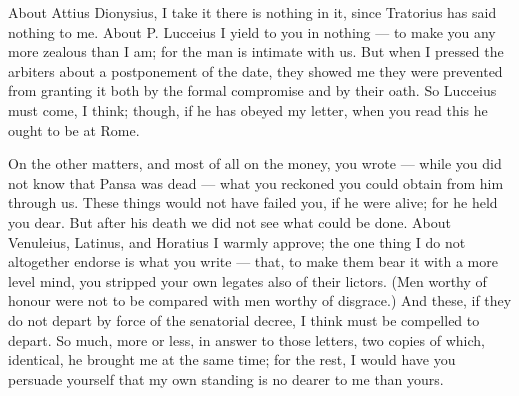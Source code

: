  About Attius Dionysius, I take it there is nothing in it, since Tratorius has said nothing to me. About P. Lucceius I yield to you in nothing --- to make you any more zealous than I am; for the man is intimate with us. But when I pressed the arbiters about a postponement of the date, they showed me they were prevented from granting it both by the formal compromise and by their oath. So Lucceius must come, I think; though, if he has obeyed my letter, when you read this he ought to be at Rome.

 On the other matters, and most of all on the money, you wrote --- while you did not know that Pansa was dead --- what you reckoned you could obtain from him through us. These things would not have failed you, if he were alive; for he held you dear. But after his death we did not see what could be done. About Venuleius, Latinus, and Horatius I warmly approve; the one thing I do not altogether endorse is what you write --- that, to make them bear it with a more level mind, you stripped your own legates also of their lictors. (Men worthy of honour were not to be compared with men worthy of disgrace.) And these, if they do not depart by force of the senatorial decree, I think must be compelled to depart. So much, more or less, in answer to those letters, two copies of which, identical, he brought me at the same time; for the rest, I would have you persuade yourself that my own standing is no dearer to me than yours.
